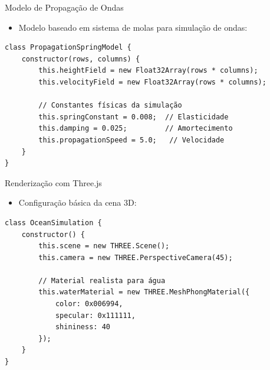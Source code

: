 \documentclass[aspectratio=169,xcolor=table]{beamer}
\begin{document}
\begin{frame}[fragile]{Modelo de Propagação de Ondas}
    \begin{itemize}
        \item Modelo baseado em sistema de molas para simulação de ondas:
    \end{itemize}
    \begin{verbatim}
class PropagationSpringModel {
    constructor(rows, columns) {
        this.heightField = new Float32Array(rows * columns);
        this.velocityField = new Float32Array(rows * columns);
        
        // Constantes físicas da simulação
        this.springConstant = 0.008;  // Elasticidade
        this.damping = 0.025;         // Amortecimento
        this.propagationSpeed = 5.0;   // Velocidade
    }
}
    \end{verbatim}
\end{frame}

\begin{frame}[fragile]{Renderização com Three.js}
    \begin{itemize}
        \item Configuração básica da cena 3D:
    \end{itemize}
    \begin{verbatim}
class OceanSimulation {
    constructor() {
        this.scene = new THREE.Scene();
        this.camera = new THREE.PerspectiveCamera(45);
        
        // Material realista para água
        this.waterMaterial = new THREE.MeshPhongMaterial({
            color: 0x006994,
            specular: 0x111111,
            shininess: 40
        });
    }
}
    \end{verbatim}
\end{frame}

\end{document}
